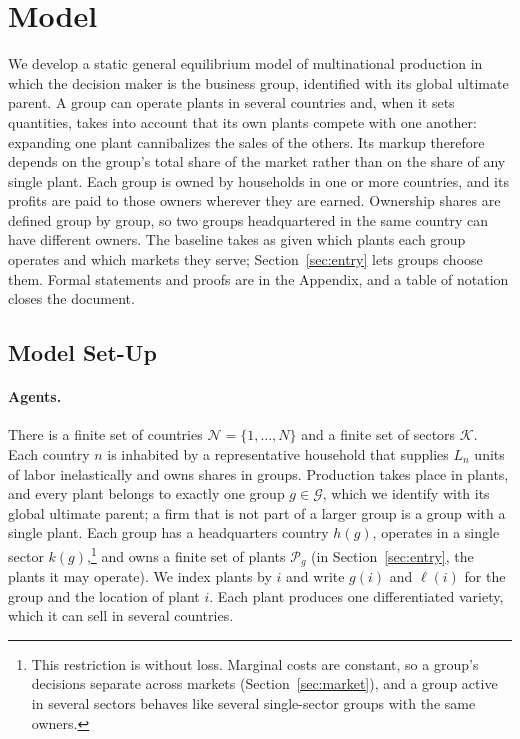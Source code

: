 \documentclass[11pt]{article}
\newcommand{\cN}{\mathcal N}
\newcommand{\cK}{\mathcal K}
\newcommand{\cG}{\mathcal G}
\newcommand{\cP}{\mathcal P}
\begin{document}
\section{Model}
\label{sec:model}

We develop a static general equilibrium model of multinational production in which
the decision maker is the business group, identified with its global ultimate parent.
A group can operate plants in several countries and, when it sets quantities, takes
into account that its own plants compete with one another: expanding one plant
cannibalizes the sales of the others. Its markup therefore
depends on the group's total share of the market rather than on the share of any
single plant. Each group is owned by households in one or more countries, and its
profits are paid to those owners wherever they are earned. Ownership shares are
defined group by group, so two groups headquartered in the same country can have
different owners. The baseline takes as given which plants each group operates and
which markets they serve; Section~\ref{sec:entry} lets groups choose them. Formal statements
and proofs are in the Appendix, and a table of notation closes the document.

\subsection{Model Set-Up}
\label{sec:setup}

\paragraph{Agents.} There is a finite set of countries $\cN=\{1,\dots,N\}$ and a
finite set of sectors $\cK$. Each country $n$ is inhabited by a representative
household that supplies $L_n$ units of labor inelastically and owns shares in groups.
Production takes place in plants, and every plant belongs to exactly one group
$g\in\cG$, which we identify with its global ultimate parent; a firm that is not part
of a larger group is a group with a single plant. Each group has a headquarters
country $h(g)$, operates in a single sector $k(g)$,\footnote{This restriction is
without loss. Marginal costs are constant, so a group's decisions separate across
markets (Section~\ref{sec:market}), and a group active in several sectors behaves like
several single-sector groups with the same owners.} and owns a finite set of plants
$\cP_g$ (in Section~\ref{sec:entry}, the plants it may operate). We index plants by
$i$ and write $g(i)$ and $\ell(i)$ for the group and the location of plant $i$. Each
plant produces one differentiated variety, which it can sell in several countries.
\end{document}
